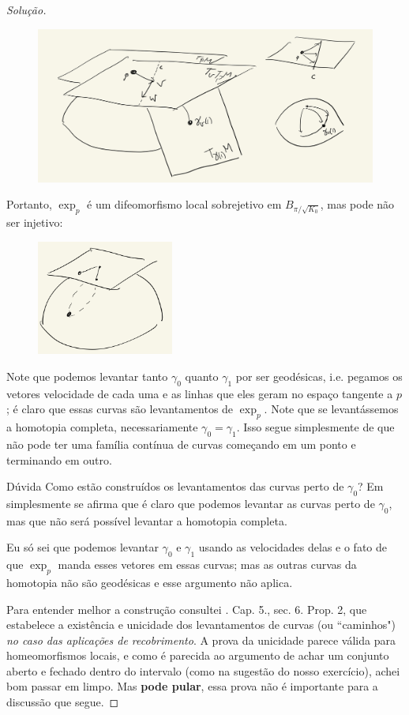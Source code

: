 \begin{proof}[Solução]
\begin{figure}[H]
	\centering
	\includegraphics[width=0.75 \textwidth]{fig8}
\end{figure}
Portanto, \(\operatorname{exp}_p\) é um difeomorfismo local sobrejetivo em \(B_{\pi/\sqrt{K_0}}\), mas pode não ser injetivo:
\begin{figure}[H]
	\centering
	\includegraphics[width=0.4\textwidth]{fig10}
\end{figure}
Note que podemos levantar tanto \(\gamma_0\) quanto \(\gamma_1\) por ser geodésicas, i.e. pegamos os vetores velocidade de cada uma e as linhas que eles geram no espaço tangente a \(p\); é claro que essas curvas são levantamentos de \(\operatorname{exp}_p\). Note que se levantássemos a homotopia completa, necessariamente \(\gamma_0=\gamma_1\). Isso segue simplesmente de que não pode ter uma família contínua de curvas começando em um ponto e terminando em outro.

\begin{thing7}{Dúvida}\leavevmode
Como estão construídos os levantamentos das curvas perto de \(\gamma_0\)? Em \cite{doc} simplesmente se afirma que é claro que podemos levantar as curvas perto de \(\gamma_0\), mas que não será possível levantar a homotopia completa.

Eu só sei que podemos levantar \(\gamma_0\) e \(\gamma_1\) usando as velocidades delas e o fato de que \(\operatorname{exp}_p\) manda esses vetores em essas curvas; mas as outras curvas da homotopia não são geodésicas e esse argumento não aplica.
\end{thing7}

Para entender melhor a construção consultei \cite{docsu}. Cap. 5., sec. 6. Prop. 2, que estabelece a existência e unicidade dos levantamentos de curvas (ou ``caminhos") \textit{no caso das aplicações de recobrimento}. A prova da unicidade parece válida para homeomorfismos locais, e como é parecida ao argumento de achar um conjunto aberto e fechado dentro do intervalo (como na sugestão do nosso exercício), achei bom passar em limpo. Mas \textbf{pode pular}, essa prova não é importante para a discussão que segue.


\end{proof}
